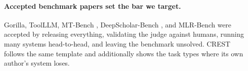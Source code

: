 \paragraph{Accepted benchmark papers set the bar we target.} Gorilla, ToolLLM, MT-Bench
\citep{zheng2023mtbench}, DeepScholar-Bench \citep{deepscholarbench2025}, and MLR-Bench
\citep{chen2025mlrbench} were accepted by releasing everything, validating the judge against
humans, running many systems head-to-head, and leaving the benchmark unsolved. CREST follows the
same template and additionally shows the task types where its own author's system loses.
